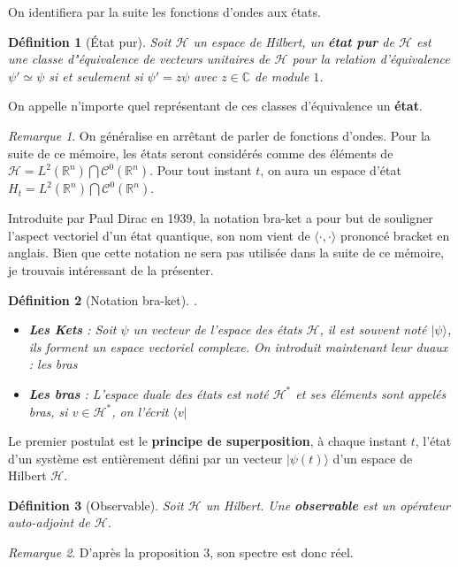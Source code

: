 \documentclass[a4paper, 12pt]{report}
\newcommand{\R}{\mathbb{R}} %
\renewcommand{\.}{\cdot} %
\theoremstyle{break}
\newtheorem{definition}{Définition}
\theoremstyle{remark}
\newtheorem{remark}{Remarque}
\theoremstyle{proofstyle}
\begin{document}
On identifiera par la suite les fonctions d'ondes aux états.

\begin{definition}[État pur]
    Soit $\mathcal{H}$ un espace de Hilbert, un \textbf{état pur} de $\mathcal{H}$ est une classe d"équivalence de vecteurs unitaires de $\mathcal{H}$ pour la relation d'équivalence $\psi' \simeq \psi$ si et seulement si $\psi ' = z \psi$ avec $z \in \mathbb{C}$ de module $1$.
\end{definition}

On appelle n'importe quel représentant de ces classes d'équivalence un \textbf{état}.
\begin{remark}
    On généralise en arrêtant de parler de fonctions d'ondes. Pour la suite de ce mémoire, les états seront considérés comme des éléments de $\mathcal{H} = L^2(\R^n) \bigcap \mathcal{C}^0(\R^n)$. Pour tout instant $t$, on aura un espace d'état $H_t = L^2(\R^n) \bigcap \mathcal{C}^0(\R^n)$.
\end{remark}\vspace{10pt}

Introduite par Paul Dirac en 1939, la notation bra-ket a pour but de souligner l'aspect vectoriel d'un état quantique, son nom vient de $\langle \cdot, \cdot \rangle$ prononcé bracket en anglais. Bien que cette notation ne sera pas utilisée dans la suite de ce mémoire, je trouvais intéressant de la présenter. \vspace{5pt}

\begin{definition}[Notation bra-ket]
    .
    \begin{itemize}
        \item \textbf{Les Kets} : Soit $\psi$ un vecteur de l'espace des états $\mathcal{H}$, il est souvent noté $| \psi \rangle$, ils forment un espace vectoriel complexe. On introduit maintenant leur duaux : les bras
        \item \textbf{Les bras} : L'espace duale des états est noté $\mathcal{H}^*$ et ses éléments sont appelés bras, si $v \in \mathcal{H}^*$, on l'écrit $\langle v |$
    \end{itemize}
\end{definition}

Le premier postulat est le \textbf{principe de superposition}, à chaque instant $t$, l'état d'un système est entièrement défini par un vecteur $|\psi(t)\rangle$ d'un espace de Hilbert $\mathcal{H}$. \vspace{10pt}

\begin{definition}[Observable]
    Soit $\mathcal{H}$ un Hilbert. Une \textbf{observable} est un opérateur auto-adjoint de $\mathcal{H}$.
\end{definition}
\begin{remark}
    D'après la proposition 3, son spectre est donc réel.
\end{remark}
\end{document}
